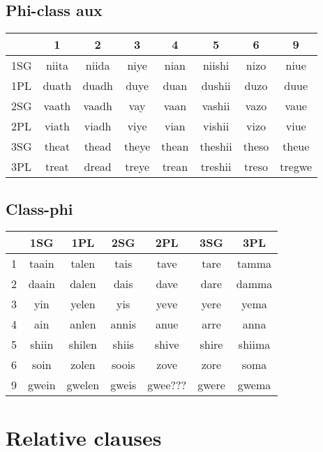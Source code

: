 \documentclass[11pt]{article}
\begin{document}
\subsection{Phi-class aux}
\begin{center}
	\begin{tabular}{|l|c|c|c|c|c|c|c|}
	\hline
	& 1 & 2 & 3 & 4 & 5 & 6 & 9 \\ \hline
    1SG & niita & niida & niye & nian & niishi & nizo & niue  \\ \hline
    1PL & duath & duadh & duye & duan & dushii & duzo & duue \\ \hline 
    2SG & vaath & vaadh & vay & vaan & vashii & vazo & vaue \\ \hline
    2PL & viath & viadh & viye & vian & vishii & vizo & viue \\ \hline
  	3SG & theat & thead & theye & thean & theshii & theso & theue \\ \hline
  	3PL & treat & dread & treye & trean & treshii & treso & tregwe \\ \hline
	\end{tabular}
\end{center}

\subsection{Class-phi}
\begin{center}
	\begin{tabular}{|l|c|c|c|c|c|c|}
	  \hline
      & 1SG & 1PL & 2SG & 2PL & 3SG & 3PL \\ \hline
      1 & taain & talen & tais & tave & tare & tamma  \\ \hline
      2 & daain & dalen & dais & dave & dare & damma \\ \hline
      3 & yin  & yelen & yis & yeve & yere & yema \\ \hline
      4 & ain & anlen & annis & anue & arre & anna \\ \hline
      5 & shiin & shilen & shiis & shive & shire  & shiima\\ \hline
      6 & soin & zolen & soois & zove & zore & soma \\ \hline
      9 & gwein & gwelen & gweis & gwee??? & gwere & gwema\\ \hline
      \end{tabular}
\end{center}

\section{Relative clauses}
\end{document}
